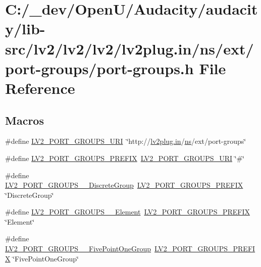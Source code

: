 \hypertarget{port-groups_8h}{}\section{C\+:/\+\_\+dev/\+Open\+U/\+Audacity/audacity/lib-\/src/lv2/lv2/lv2/lv2plug.in/ns/ext/port-\/groups/port-\/groups.h File Reference}
\label{port-groups_8h}
\subsection*{Macros}
\begin{DoxyCompactItemize}
\item 
\#define \hyperlink{port-groups_8h_a3f7ba5ba5b5d58ceb0a694e88c62cf3e}{L\+V2\+\_\+\+P\+O\+R\+T\+\_\+\+G\+R\+O\+U\+P\+S\+\_\+\+U\+RI}~\char`\"{}http\+://\hyperlink{latency_8c_a7d946209d777cb95fe30364b8d321207}{lv2plug.\+in}/\hyperlink{xmltok_8c_ab6aec1346fb6c7b2733f0f73c9536ad2}{ns}/ext/port-\/groups\char`\"{}
\item 
\#define \hyperlink{port-groups_8h_ad8eff71f3c96d9bf45282fed8195fde3}{L\+V2\+\_\+\+P\+O\+R\+T\+\_\+\+G\+R\+O\+U\+P\+S\+\_\+\+P\+R\+E\+F\+IX}~\hyperlink{port-groups_8h_a3f7ba5ba5b5d58ceb0a694e88c62cf3e}{L\+V2\+\_\+\+P\+O\+R\+T\+\_\+\+G\+R\+O\+U\+P\+S\+\_\+\+U\+RI} \char`\"{}\#\char`\"{}
\item 
\#define \hyperlink{port-groups_8h_a2246cb30066bbb9c06867c7fcf356d74}{L\+V2\+\_\+\+P\+O\+R\+T\+\_\+\+G\+R\+O\+U\+P\+S\+\_\+\+\_\+\+Discrete\+Group}~\hyperlink{port-groups_8h_ad8eff71f3c96d9bf45282fed8195fde3}{L\+V2\+\_\+\+P\+O\+R\+T\+\_\+\+G\+R\+O\+U\+P\+S\+\_\+\+P\+R\+E\+F\+IX} \char`\"{}Discrete\+Group\char`\"{}
\item 
\#define \hyperlink{port-groups_8h_a9f0c10afc7f7f58d28e8d29353fc6e4e}{L\+V2\+\_\+\+P\+O\+R\+T\+\_\+\+G\+R\+O\+U\+P\+S\+\_\+\+\_\+\+Element}~\hyperlink{port-groups_8h_ad8eff71f3c96d9bf45282fed8195fde3}{L\+V2\+\_\+\+P\+O\+R\+T\+\_\+\+G\+R\+O\+U\+P\+S\+\_\+\+P\+R\+E\+F\+IX} \char`\"{}Element\char`\"{}
\item 
\#define \hyperlink{port-groups_8h_ac1af4c3e441a74e2eb9f127419f86fed}{L\+V2\+\_\+\+P\+O\+R\+T\+\_\+\+G\+R\+O\+U\+P\+S\+\_\+\+\_\+\+Five\+Point\+One\+Group}~\hyperlink{port-groups_8h_ad8eff71f3c96d9bf45282fed8195fde3}{L\+V2\+\_\+\+P\+O\+R\+T\+\_\+\+G\+R\+O\+U\+P\+S\+\_\+\+P\+R\+E\+F\+IX} \char`\"{}Five\+Point\+One\+Group\char`\"{}

\end{DoxyCompactItemize}
